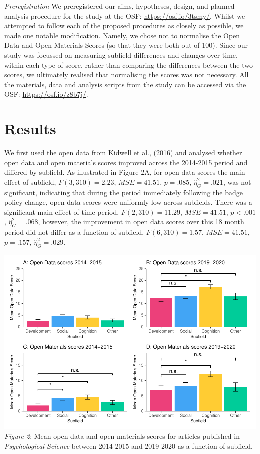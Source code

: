 \documentclass[
  english,
  man,floatsintext]{apa6}
\begin{document}
\emph{Preregistration} We preregistered our aims, hypotheses, design, and planned analysis procedure for the study at the OSF: \url{https://osf.io/3tsmy/}. Whilst we attempted to follow each of the proposed procedures as closely as possible, we made one notable modification. Namely, we chose not to normalise the Open Data and Open Materials Scores (so that they were both out of 100). Since our study was focussed on measuring subfield differences and changes over time, within each type of score, rather than comparing the differences between the two scores, we ultimately realised that normalising the scores was not necessary. All the materials, data and analysis scripts from the study can be accessed via the OSF: \url{https://osf.io/z8b7j/}.

\hypertarget{results}{%
\section{Results}\label{results}}

We first used the open data from Kidwell et al., (2016) and analysed whether open data and open materials scores improved across the 2014-2015 period and differed by subfield. As illustrated in Figure 2A, for open data scores the main effect of subfield, \(F(3, 310) = 2.23\), \(\mathit{MSE} = 41.51\), \(p = .085\), \(\hat{\eta}^2_G = .021\), was not significant, indicating that during the period immediately following the badge policy change, open data scores were uniformly low across subfields. There was a significant main effect of time period, \(F(2, 310) = 11.29\), \(\mathit{MSE} = 41.51\), \(p < .001\), \(\hat{\eta}^2_G = .068\), however, the improvement in open data scores over this 18 month period did not differ as a function of subfield, \(F(6, 310) = 1.57\), \(\mathit{MSE} = 41.51\), \(p = .157\), \(\hat{\eta}^2_G = .029\).

\includegraphics{icd_special_issue_files/figure-latex/unnamed-chunk-2-1.pdf}
\emph{Figure 2}: Mean open data and open materials scores for articles published in \emph{Psychological Science} between 2014-2015 and 2019-2020 as a function of subfield.
\end{document}
